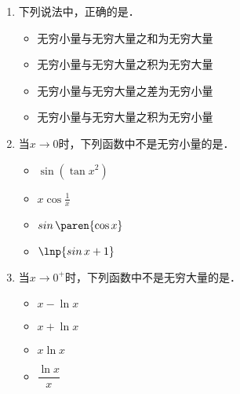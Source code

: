 \documentclass[a4paper,punct=CCT]{ctexbook}
\theoremstyle{definition}
\theoremstyle{remark}
\newif\ifshowsol
\let\geq\geqslant
\let\ge\geq}
\begin{document}
\begin{enumerate}
\item 下列说法中，正确的是\uline{\makebox[6em]{}}．
  \begin{itemize}
    \renewcommand{\labelitemi}{\faCircleThin}
    \ifshowsol
  \item[\faCircle]
    \else
  \item
    \fi
    无穷小量与无穷大量之和为无穷大量
  \item 无穷小量与无穷大量之积为无穷大量
  \item 无穷小量与无穷大量之差为无穷小量
  \item 无穷小量与无穷大量之积为无穷小量
  \end{itemize}

  \ifshowsol
  令\(f(x) = \sin x,\ g(x) = \frac1x\)，则在原点处\(\,f\mkern2mu\)和\(\mkern1mu g\)分别是无穷小量和无穷大量．但是\(\,f \cdot g\)即不是无穷小量，也不是无穷大量．所以选项~B和~D都错了．设\(\,f\mkern2mu\)和\(\mkern2mu g\)在点\(a\)处分别是无穷小量和无穷大量．对于任意的\(M > 0\)都存在一个去心邻域使得当\(x\)在此邻域上时都有
  \begin{gather*}
    \abs*{\,f(x)} < M
    \txt{且}
    2\,M < \abs*{g(x)} \\
    \shortintertext{即}
    \abs*{\,f(x) \pm g(x)}
    \ge \abs[\Big]{\abs*{g(x)} - \abs*{\,f(x)}}
    \ge \abs*{g(x)} - \abs*{\,f(x)}
    > M.
  \end{gather*}
  所以选项~A对了而选项~C错了．
  \fi

\item 当\(x \to 0\)时，下列函数中不是无穷小量的是\uline{\makebox[6em]{}}．
  \begin{itemize}
    \renewcommand{\labelitemi}{\faCircleThin}
  \item \(\sin(\tan x^2)\)
  \item \(x \cos\frac1x\)
    \ifshowsol
  \item[\faCircle]
    \else
  \item
    \fi
    \(\sin\paren{\cos x}\)
  \item \(\lnp{\sin x + 1}\)
  \end{itemize}

\item 当\(x \to 0^+\)时，下列函数中不是无穷大量的是\uline{\makebox[6em]{}}．
  \begin{itemize}
    \renewcommand{\labelitemi}{\faCircleThin}
  \item \(x - \ln x\)
  \item \(x + \ln x\)
    \ifshowsol
  \item[\faCircle]
    \else
  \item
    \fi
    \(x \ln x\)
  \item \(\dfrac{\ln x}{x}\)\rule{0ex}{3.5ex}
  \end{itemize}


\end{enumerate}
\end{document}
